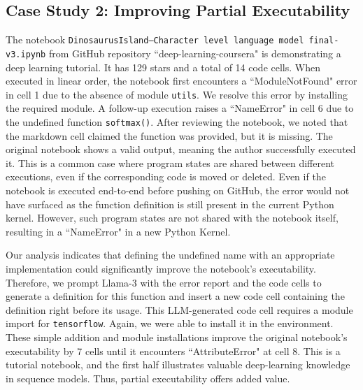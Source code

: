 \subsection{Case Study 2: Improving Partial Executability}
\label{case_study_2}

    The notebook {\small{\texttt{DinosaurusIsland--Character level language model final-v3.ipynb}}} from GitHub repository ``deep-learning-coursera" \cite{gemaatienza} is demonstrating a deep learning tutorial. It has 129 stars and a total of 14 code cells. When executed in linear order, the notebook first encounters a ``ModuleNotFound" error in cell 1 due to the absence of module {\small{\texttt{utils}}}. We resolve this error by installing the required module. A follow-up execution raises a ``NameError" in cell 6 due to the undefined function {\small{\texttt{softmax()}}}. After reviewing the notebook, we noted that the markdown cell claimed the function was provided, but it is missing. The original notebook shows a valid output, meaning the author successfully executed it. This is a common case where program states are shared between different executions, even if the corresponding code is moved or deleted. Even if the notebook is executed end-to-end before pushing on GitHub, the error would not have surfaced as the function definition is still present in the current Python kernel. However, such program states are not shared with the notebook itself, resulting in a ``NameError" in a new Python Kernel. 
    
    Our analysis indicates that defining the undefined name with an appropriate implementation could significantly improve the notebook's executability. Therefore, we prompt Llama-3 with the error report and the code cells to generate a definition for this function and insert a new code cell containing the definition right before its usage. This LLM-generated code cell requires a module import for {\small{\texttt{tensorflow}}}. Again, we were able to install it in the environment. These simple addition and module installations improve the original notebook's executability by 7 cells until it encounters ``AttributeError" at cell 8. This is a tutorial notebook, and the first half illustrates valuable deep-learning knowledge in sequence models. Thus, partial executability offers added value.


